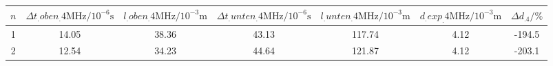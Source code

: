 \label{tab:tabAScan4}
	\begin{tabular}{S[table-format=1.0]S[table-format=2.2]S[table-format=2.2]S[table-format=2.2]S[table-format=2.2]S[table-format=2.2]S[table-format=2.1]}
		\toprule
		{$n$} & {$\Delta t_.{oben_.{4\si{\mega\hertz} } }/10^{-6}\si{\second}$} & {$l_.{oben_.{4\si{\mega\hertz} } }/10^{-3}\si{\metre}$} & {$\Delta t_.{unten_.{4\si{\mega\hertz} } }/10^{-6}\si{\second}$} & {$l_.{unten_.{4\si{\mega\hertz} } }/10^{-3}\si{\metre}$} & {$d_.{exp_.{4\si{\mega\hertz} } }/10^{-3}\si{\metre}$} & {$\Delta d_.4/\%$} \\
		 & 14.05 & 38.36 & 43.13 & 117.74 & 4.12 & -194.5 \\
		2 & 12.54 & 34.23 & 44.64 & 121.87 & 4.12 & -203.1 \\
		\bottomrule
	\end{tabular}
